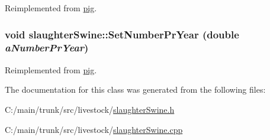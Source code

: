 Reimplemented from \hyperlink{classpig_a093788c67f8ab28b6e9da95bca443b89}{pig}.\hypertarget{classslaughter_swine_a5d9ea11f9aaf40490cdd27baceb91e91}{
\subsubsection[{SetNumberPrYear}]{\setlength{\rightskip}{0pt plus 5cm}void slaughterSwine::SetNumberPrYear (double {\em aNumberPrYear})}}
\label{classslaughter_swine_a5d9ea11f9aaf40490cdd27baceb91e91}


Reimplemented from \hyperlink{classpig_a5ada344ee9223275a5dec61f71ce7bb4}{pig}.

The documentation for this class was generated from the following files:\begin{DoxyCompactItemize}
\item 
C:/main/trunk/src/livestock/\hyperlink{slaughter_swine_8h}{slaughterSwine.h}\item 
C:/main/trunk/src/livestock/\hyperlink{slaughter_swine_8cpp}{slaughterSwine.cpp}\end{DoxyCompactItemize}
